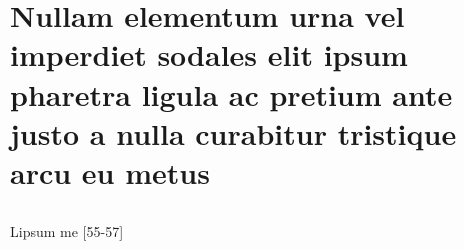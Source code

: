 

\chapter[Nullam elementum urna vel imperdiet sodales elit ipsum]{Nullam elementum urna vel imperdiet sodales elit ipsum pharetra ligula
	ac pretium ante justo a nulla curabitur tristique arcu eu metus}

\showfont
\section[Some encoding tests]{\showfont}
\subsection{\showfont}
\subsubsection{\showfont}
\subsubsubsection{\showfont}



Lipsum me [55-57]


